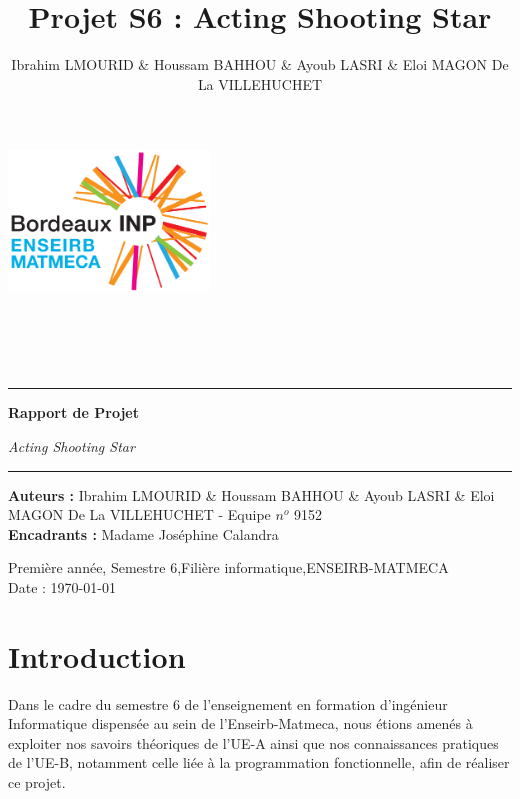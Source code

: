 \documentclass[a4paper,10pt]{article}
\begin{document}
\title{Projet S6 : Acting Shooting Star }
\author{Ibrahim LMOURID \& Houssam BAHHOU \& Ayoub LASRI \& Eloi MAGON De La VILLEHUCHET}


\label{sec:title}
\thispagestyle{empty}


\includegraphics[width=0.4\textwidth]{Logo.png}
\\
\\
\\
\\
\\
\noindent\rule{\textwidth}{1pt}
\begin{flushright}
  \Huge
  \textbf{Rapport de Projet }

    \vspace{15pt}
  \large 
  \textsl{Acting Shooting Star }

\end{flushright}
\noindent\rule{\textwidth}{1pt}


\large
\noindent\textbf{Auteurs   : }  \textup{Ibrahim LMOURID \& Houssam BAHHOU \& Ayoub LASRI \& Eloi MAGON De La VILLEHUCHET - Equipe $n^{o}$ 9152 } \\
\noindent\textbf{Encadrants :} \textup{ Madame Joséphine Calandra  }

\normalsize
\begin{center}
  Première année, Semestre 6,Filière informatique,ENSEIRB-MATMECA\\
  Date : \today
\end{center}



\newpage
\tableofcontents

\newpage
\section{Introduction}
Dans le cadre du semestre 6 de l'enseignement en formation d'ingénieur Informatique dispensée au sein de l'Enseirb-Matmeca, nous étions amenés à exploiter nos savoirs théoriques de l'UE-A ainsi que nos connaissances pratiques de l'UE-B, notamment celle liée à la programmation fonctionnelle, afin de réaliser ce projet.
\newline
\end{document}
